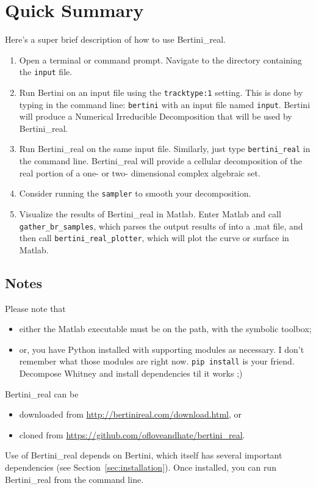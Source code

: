 \section{Quick Summary}
\label{sec:started}

Here's a super brief description of how to use Bertini\_real.


\begin{enumerate}
\item Open a terminal or command prompt. Navigate to the directory containing the {\tt input} file.
\item Run Bertini on an input file using the \texttt{tracktype:1} setting. This is done by typing in the command line: \texttt{bertini} with an input file named \texttt{input}. Bertini will produce a Numerical Irreducible Decomposition that will be used by Bertini\_real.
\item Run Bertini\_real on the same input file. Similarly, just type \texttt{bertini\_real} in the command line. Bertini\_real will provide a cellular decomposition of the real portion of a one- or two- dimensional complex algebraic set.
\item Consider running the {\tt sampler} to smooth your decomposition.
\item Visualize the results of Bertini\_real in Matlab. Enter Matlab and call \texttt{gather\_br\_samples}, which parses the output results of  into a .mat file, and then call \texttt{bertini\_real\_plotter}, which will plot the curve or surface in Matlab. 




\end{enumerate}

\subsection*{Notes}

 Please note that 
	\begin{itemize}
	\item either the Matlab executable must be on the path, with the symbolic toolbox;
	\item or, you have Python installed with supporting modules as necessary.  I don't remember what those modules are right now.  {\tt pip install} is your friend.  Decompose Whitney and install dependencies til it works ;)
	\end{itemize}

Bertini\_real can be 
\begin{itemize}
\item downloaded from \url{http://bertinireal.com/download.html}, or 
\item cloned from \url{https://github.com/ofloveandhate/bertini_real}.  
\end{itemize}
Use of Bertini\_real depends on Bertini, which itself has several important dependencies (see Section~\ref{sec:installation}).
Once installed, you can run Bertini\_real from the command line. 


